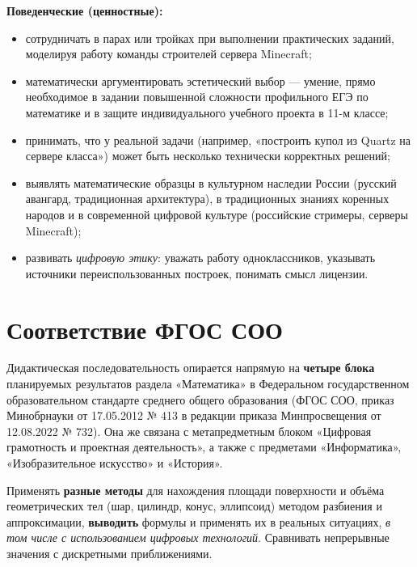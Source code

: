 \documentclass[12pt,a4paper]{scrartcl}
\newcommand{\acc}[1]{\textcolor{accent}{\textbf{#1}}}
\begin{document}
\textbf{Поведенческие (ценностные):}
\begin{itemize}[leftmargin=1.3em,itemsep=0.2em,topsep=0.3em]
  \item сотрудничать в парах или тройках при выполнении практических заданий, моделируя работу команды строителей сервера Minecraft;
  \item математически аргументировать эстетический выбор --- умение, прямо необходимое в задании повышенной сложности профильного ЕГЭ по математике и в защите индивидуального учебного проекта в 11-м классе;
  \item принимать, что у реальной задачи (например, «построить купол из Quartz на сервере класса») может быть несколько технически корректных решений;
  \item выявлять математические образцы в культурном наследии России (русский авангард, традиционная архитектура), в традиционных знаниях коренных народов и в современной цифровой культуре (российские стримеры, серверы Minecraft);
  \item развивать \emph{цифровую этику}: уважать работу одноклассников, указывать источники переиспользованных построек, понимать смысл лицензии.
\end{itemize}

\section{Соответствие ФГОС СОО}\label{sec:fgos}

Дидактическая последовательность опирается напрямую на \acc{четыре блока} планируемых результатов раздела «Математика» в Федеральном государственном образовательном стандарте среднего общего образования (ФГОС СОО, приказ Минобрнауки от 17.05.2012 № 413 в редакции приказа Минпросвещения от 12.08.2022 № 732). Она же связана с метапредметным блоком «Цифровая грамотность и проектная деятельность», а также с предметами «Информатика», «Изобразительное искусство» и «История».

\begin{standart}
Применять \acc{разные методы} для нахождения площади поверхности и объёма геометрических тел (шар, цилиндр, конус, эллипсоид) методом разбиения и аппроксимации, \acc{выводить} формулы и применять их в реальных ситуациях, \emph{в том числе с использованием цифровых технологий}. Сравнивать непрерывные значения с дискретными приближениями.
\end{standart}
\end{document}
